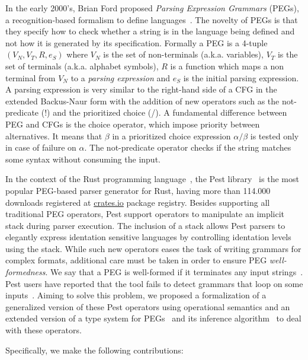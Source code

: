 \documentclass[preprint,12pt]{elsarticle}
\theoremstyle{definition}
\begin{document}
In the early 2000's, Brian Ford proposed \emph{Parsing Expression Grammars}
(PEGs),  a recognition-based formalism to
define languages~\cite{Ford2004}. The novelty of PEGs is that they
specify how to check whether a string is in
the language being defined and not how it is generated by its specification.
Formally a PEG is a 4-tuple $(V_N, V_T, R, e_S)$ where $V_N$ is the set of non-terminals
(a.k.a. variables), $V_T$ is the set of terminals (a.k.a. alphabet symbols),
$R$ is a function which maps a non terminal from $V_N$ to a {\it parsing expression}
and $e_S$ is the initial parsing
expression. A parsing expression is very
similar to the right-hand side of a CFG in the extended Backus-Naur
form with the addition of new operators such as the not-predicate (!) and
the prioritized choice (/). A fundamental difference between PEG
and CFGs is the choice operator, which impose priority between alternatives.
It means that $\beta$ in a prioritized choice expression $\alpha / \beta$ is tested only
in case of failure on $\alpha$. The not-predicate operator checks
if the string matches some syntax without consuming the input.

In the context of the Rust programming language~\cite{RustBook}, the
Pest library~\cite{PEST} is the most popular PEG-based parser
generator for Rust, having more than 114.000 downloads registered at
\href{http://crates.io}{crates.io} package registry. Besides supporting
all traditional PEG operators, Pest support operators to manipulate an
implicit stack during parser execution. The inclusion of a stack allows
Pest parsers to elegantly express identation sensitive languages by
controlling identation levels using the stack. While such new operators
eases the task of writing grammars for complex formats, additional care
must be taken in order to ensure PEG \emph{well-formedness}. We
say that a PEG is well-formed if it terminates any input
strings~\cite{Ford2004}. Pest users have reported that the tool
fails to detect grammars that loop on some inputs~\cite{PESTBUG}.
Aiming to solve this problem, we proposed a formalization of a generalized
version of these Pest operators using operational semantics and
an extended version of a type system for PEGs~\cite{Ribeiro19} and its
inference algorithm~\cite{Cardoso23} to deal with these operators.

Specifically, we make the following contributions:
\end{document}
